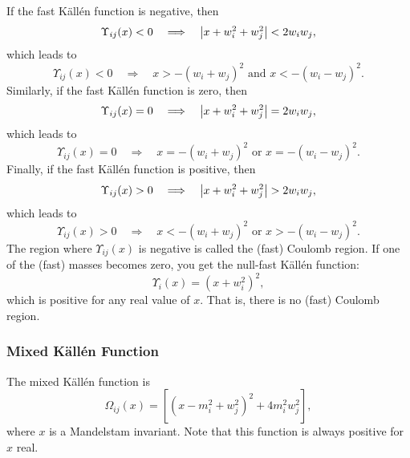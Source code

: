 If the fast K\"{a}ll\'{e}n function is negative, then
\begin{equation}
	\Upsilon_{ij}(x) < 0 \quad \Longrightarrow \quad \left\lvert x + w_{i}^{2} + w_{j}^{2} \right\rvert < 2 w_{i} w_{j},
\end{equation}
which leads to
\begin{equation}
	\Upsilon_{ij}(x) < 0 \quad \Longrightarrow \quad x > -\left(w_{i} + w_{j}\right)^{2} \text{ and } x < -\left(w_{i} - w_{j}\right)^{2}.
\end{equation}
Similarly, if the fast K\"{a}ll\'{e}n function is zero, then
\begin{equation}
	\Upsilon_{ij}(x) = 0 \quad \Longrightarrow \quad \left\lvert x + w_{i}^{2} + w_{j}^{2} \right\rvert = 2 w_{i} w_{j},
\end{equation}
which leads to
\begin{equation}
	\Upsilon_{ij}(x) = 0 \quad \Longrightarrow \quad x = -\left(w_{i} + w_{j}\right)^{2} \text{ or } x = -\left(w_{i} - w_{j}\right)^{2}.
\end{equation}
Finally, if the fast K\"{a}ll\'{e}n function is positive, then
\begin{equation}
	\Upsilon_{ij}(x) > 0 \quad \Longrightarrow \quad \left\lvert x + w_{i}^{2} + w_{j}^{2} \right\rvert > 2 w_{i} w_{j},
\end{equation}
which leads to
\begin{equation}
	\Upsilon_{ij}(x) > 0 \quad \Longrightarrow \quad x < -\left(w_{i} + w_{j}\right)^{2} \text{ or } x > -\left(w_{i} - w_{j}\right)^{2}.
\end{equation}
The region where $\Upsilon_{ij}(x)$ is negative is called the (fast) Coulomb region. If one of the (fast) masses becomes zero, you get the null-fast K\"{a}ll\'{e}n function:
\begin{equation}
	\Upsilon_{i}(x) = \left( x + w_{i}^{2} \right)^{2},
\end{equation}
which is positive for any real value of $x$. That is, there is no (fast) Coulomb region.
\subsubsection{Mixed K\"{a}ll\'{e}n Function}
The mixed K\"{a}ll\'{e}n function is
\begin{equation}
	\Omega_{ij}(x) = \left[ \left(x - m_{i}^{2} + w_{j}^{2} \right)^{2} + 4 m_{i}^{2} w_{j}^{2} \right],
\end{equation}
where $x$ is a Mandelstam invariant. Note that this function is always positive for $x$ real.
